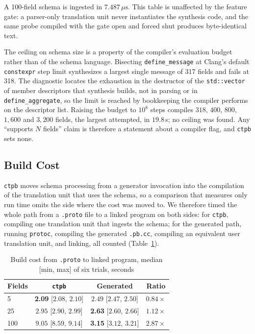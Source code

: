 A 100-field schema is ingested in $7.487\,\mu\text{s}$. This table is unaffected by the feature gate: a parser-only translation unit never instantiates the synthesis code, and the same probe compiled with the gate open and forced shut produces byte-identical text.

The ceiling on schema size is a property of the compiler's evaluation budget rather than of the schema language. Bisecting \texttt{define\_message} at Clang's default \texttt{constexpr} step limit synthesizes a largest single message of 317 fields and fails at 318. The diagnostic locates the exhaustion in the destructor of the \texttt{std::vector} of member descriptors that synthesis builds, not in parsing or in \texttt{define\_aggregate}, so the limit is reached by bookkeeping the compiler performs on the descriptor list. Raising the budget to $10^{8}$ steps compiles $318$, $400$, $800$, $1{,}600$ and $3{,}200$ fields, the largest attempted, in $19.8$\,s; no ceiling was found. Any ``supports $N$ fields'' claim is therefore a statement about a compiler flag, and \texttt{ctpb} sets none.

\subsection{Build Cost}
\texttt{ctpb} moves schema processing from a generator invocation into the compilation of the translation unit that uses the schema, so a comparison that measures only run time omits the side where the cost was moved to. We therefore timed the whole path from a \texttt{.proto} file to a linked program on both sides: for \texttt{ctpb}, compiling one translation unit that ingests the schema; for the generated path, running \texttt{protoc}, compiling the generated \texttt{.pb.cc}, compiling an equivalent user translation unit, and linking, all counted (Table~\ref{tab:build_cost}).

\begin{table}[ht]
\centering
\caption{Build cost from \texttt{.proto} to linked program, median [min, max] of six trials, seconds}
\label{tab:build_cost}
\renewcommand{\arraystretch}{1.15}
\setlength{\tabcolsep}{3pt}
\scriptsize
\begin{tabular}{lccc}
\hline
\textbf{Fields} & \textbf{\texttt{ctpb}} & \textbf{Generated} & \textbf{Ratio} \\
\hline
5 & \textbf{2.09} [$2.08$, $2.10$] & $2.49$ [$2.47$, $2.50$] & $0.84\times$ \\
25 & $2.95$ [$2.90$, $2.99$] & \textbf{2.63} [$2.60$, $2.66$] & $1.12\times$ \\
100 & $9.05$ [$8.59$, $9.14$] & \textbf{3.15} [$3.12$, $3.21$] & $2.87\times$ \\
\hline
\end{tabular}
\end{table}

